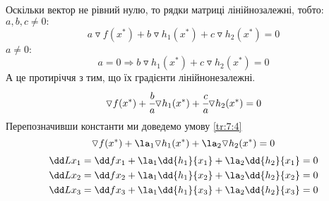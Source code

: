 Оскільки вектор не рівний нулю, то рядки матриці лінійнозалежні, тобто:\\
$a,b,c\neq 0:$\\
\begin{equation}
a\triangledown f(x^\ast) + b \triangledown h_1(x^\ast) + c \triangledown h_2(x^\ast) =0
\end{equation}
$a\neq0$:
\begin{equation}
a=0\Rightarrow b\triangledown h_1(x^\ast) + c \triangledown h_2(x^\ast) =0
\end{equation}
А це протиріччя з тим, що їх градієнти лінійнонезалежні.
\begin{equation}
\triangledown f(x^\ast) + \cfrac ba \triangledown h_1(x^\ast) + \cfrac ca \triangledown h_2(x^\ast) = 0
\end{equation}
Перепозначивши константи ми доведемо умову \eqref{tr:7:4}
\begin{equation}
\triangledown f(x^\ast) + \la_1 \triangledown h_1(x^\ast) + \la_2 \triangledown h_2(x^\ast) = 0
\end{equation}
\begin{eqnarray*}
\dd L{x_1} = \dd f{x_1} + \la_1 \dd {h_1}{x_1} + \la_2 \dd {h_2}{x_1} = 0\\
\dd L{x_2} = \dd f{x_2} + \la_1 \dd {h_1}{x_2} + \la_2 \dd {h_2}{x_2} = 0\\
\dd L{x_3} = \dd f{x_3} + \la_1 \dd {h_1}{x_3} + \la_2 \dd {h_2}{x_3} = 0
\end{eqnarray*}
